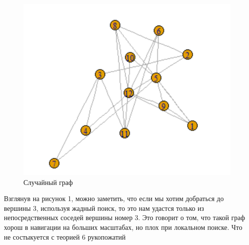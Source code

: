 \begin{figure}[H]
\centering
\includegraphics[scale=0.3]{./pictures/random_graph.png}
\caption{Случайный граф}
\end{figure}

Взглянув на рисунок 1, можно заметить, что если мы хотим добраться до вершины 3,
используя жадный поиск, то это нам удастся только из непосредственных соседей вершины номер 3.
Это говорит о том, что такой граф хорош в навигации на больших масштабах, но плох при локальном
поиске. Что не состыкуется с теорией 6 рукопожатий

